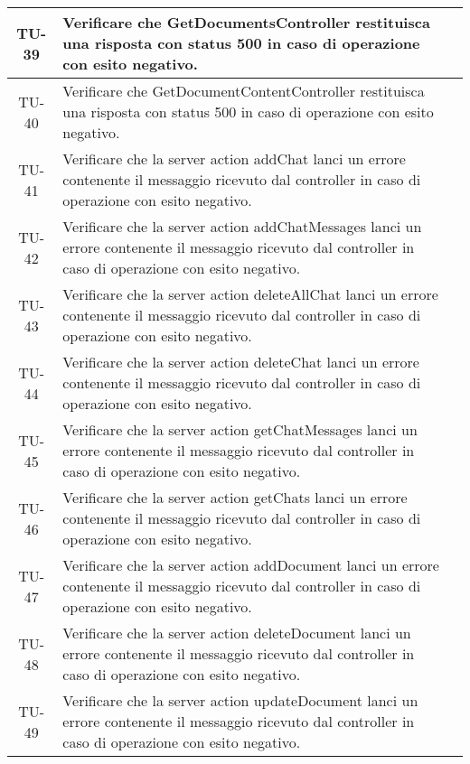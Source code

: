\begin{xltabular}{\textwidth}{| c | X | c |}
    \hline
    TU-39 & Verificare che GetDocumentsController restituisca una risposta con status 500 in caso di operazione con esito negativo. & \textcolor{cmarkcolor}{} \\
    \hline
    TU-40 & Verificare che GetDocumentContentController restituisca una risposta con status 500 in caso di operazione con esito negativo. & \textcolor{cmarkcolor}{} \\
    \hline
    TU-41 & Verificare che la server action addChat lanci un errore contenente il messaggio ricevuto dal controller in caso di operazione con esito negativo. & \textcolor{cmarkcolor}{} \\
    \hline
    TU-42 & Verificare che la server action addChatMessages lanci un errore contenente il messaggio ricevuto dal controller in caso di operazione con esito negativo. & \textcolor{cmarkcolor}{} \\
    \hline
    TU-43 & Verificare che la server action deleteAllChat lanci un errore contenente il messaggio ricevuto dal controller in caso di operazione con esito negativo. & \textcolor{cmarkcolor}{} \\
    \hline
    TU-44 & Verificare che la server action deleteChat lanci un errore contenente il messaggio ricevuto dal controller in caso di operazione con esito negativo. & \textcolor{cmarkcolor}{} \\
    \hline
    TU-45 & Verificare che la server action getChatMessages lanci un errore contenente il messaggio ricevuto dal controller in caso di operazione con esito negativo. & \textcolor{cmarkcolor}{} \\
    \hline
    TU-46 & Verificare che la server action getChats lanci un errore contenente il messaggio ricevuto dal controller in caso di operazione con esito negativo. & \textcolor{cmarkcolor}{} \\
    \hline
    TU-47 & Verificare che la server action addDocument lanci un errore contenente il messaggio ricevuto dal controller in caso di operazione con esito negativo. & \textcolor{cmarkcolor}{} \\
    \hline
    TU-48 & Verificare che la server action deleteDocument lanci un errore contenente il messaggio ricevuto dal controller in caso di operazione con esito negativo. & \textcolor{cmarkcolor}{} \\
    \hline
    TU-49 & Verificare che la server action updateDocument lanci un errore contenente il messaggio ricevuto dal controller in caso di operazione con esito negativo. & \textcolor{cmarkcolor}{} \\

\end{xltabular}
